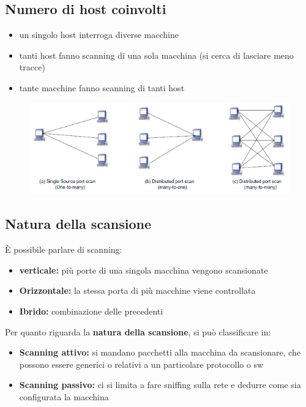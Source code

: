 \subsection{Numero di host coinvolti}
\begin{itemize}
    \item un singolo host interroga diverse macchine 
    \item tanti host fanno scanning di una sola macchina (si cerca di lasciare meno tracce)
    \item tante macchine fanno scanning di tanti host 
\end{itemize}

\begin{figure}[H]
    \centering
    \includegraphics[width=0.9\linewidth]{chapters/9/images/tipi-scansioni.png}
\end{figure}

\subsection{Natura della scansione}
È possibile parlare di scanning:
\begin{itemize}
    \item \textbf{verticale:} più porte di una singola macchina vengono scansionate 
    \item \textbf{Orizzontale:} la stessa porta di più macchine viene controllata 
    \item \textbf{Ibrido:} combinazione delle precedenti
\end{itemize}


\noindent Per quanto riguarda la \textbf{natura della scansione}, 
si può classificare in:
\begin{itemize}
    \item \textbf{Scanning attivo:} si mandano pacchetti alla macchina da scansionare, che 
    possono essere generici o relativi a un particolare protocollo o sw 
    \item \textbf{Scanning passivo:} ci si limita a fare sniffing sulla rete e dedurre come sia 
    configurata la macchina
\end{itemize}

